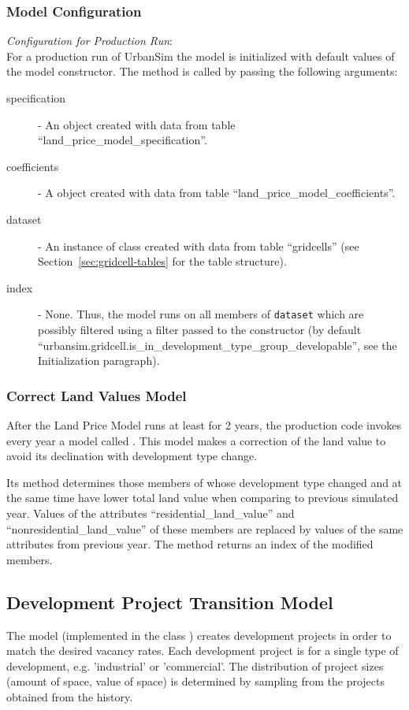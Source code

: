 \subsubsection{Model Configuration}
\modelsindex
%
{\em Configuration for Production Run}:\\[1mm]
For a production run of UrbanSim the model is
initialized with default values of the model 
constructor. The  method is called by passing the
following arguments:
\begin{description}
\item[specification] - An
 object created with data from table
``land_price_model_specification''.  
\item[coefficients] - A  object created
with data from table ``land_price_model_coefficients''.\modelsindex
\item[dataset] - An instance of class  created with data
  from table ``gridcells'' (see Section~\ref{sec:gridcell-tables} for the
  table structure).
\item[index] - None. Thus, the model runs on all members of \verb|dataset| which are possibly 
filtered using a filter passed to the constructor (by default ``urbansim.gridcell.is_in_development_type_group_developable'', see
the Initialization paragraph).
\end{description}

\subsubsection{Correct Land Values Model}
\modelsindex
%
After the Land Price Model runs at least for 2 years, the production code
invokes every year a model called . This model makes a
correction of the land value to avoid its declination with development type
change.

Its  method determines those members of  whose
development type changed and at the same time have lower total land value when
comparing to previous simulated year. Values of the attributes
``residential_land_value'' and ``nonresidential_land_value'' of these members
are replaced by values of the same attributes from previous year. The method
returns an index of the modified  members.

%
\subsection{Development Project Transition Model}
\modelsindex
%
\label{sec:development-project-transition-model}
%
The model (implemented in the class ) 
creates development projects in order to match the desired vacancy rates. Each
development project is for a single type of development, e.g.  'industrial' or
'commercial'.  The distribution of project sizes (amount of space, value of
space) is determined by sampling from the projects obtained from the history.

